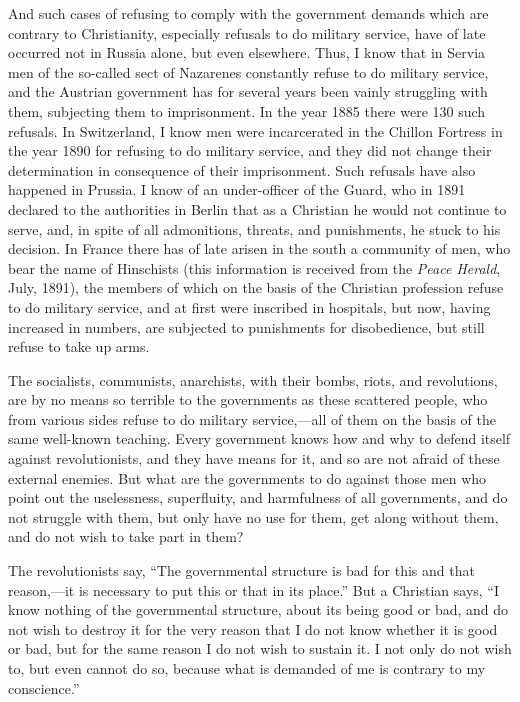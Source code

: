 \documentclass{book}
\begin{document}
And such cases of refusing to comply with the government demands which are contrary to Christianity, especially refusals to do military service, have of late occurred not in Russia alone, but even elsewhere. Thus, I know that in Servia men of the so-called sect of Nazarenes constantly refuse to do military service, and the Austrian government has for several years been vainly struggling with them, subjecting them to imprisonment. In the year 1885 there were 130 such refusals. In Switzerland, I know men were incarcerated in the Chillon Fortress in the year 1890 for refusing to do military service, and they did not change their determination in consequence of their imprisonment. Such refusals have also happened in Prussia. I know of an under-officer of the Guard, who in 1891 declared to the authorities in Berlin that as a Christian he would not continue to serve, and, in spite of all admonitions, threats, and punishments, he stuck to his decision. In France there has of late arisen in the south a community of men, who bear the name of Hinschists (this information is received from the \emph{Peace Herald}, July, 1891), the members of which on the basis of the Christian profession refuse to do military service, and at first were inscribed in hospitals, but now, having increased in numbers, are subjected to punishments for disobedience, but still refuse to take up arms.

The socialists, communists, anarchists, with their bombs, riots, and revolutions, are by no means so terrible to the governments as these scattered people, who from various sides refuse to do military service,—all of them on the basis of the same well-known teaching. Every government knows how and why to defend itself against revolutionists, and they have means for it, and so are not afraid of these external enemies. But what are the governments to do against those men who point out the uselessness, superfluity, and harmfulness of all governments, and do not struggle with them, but only have no use for them, get along without them, and do not wish to take part in them?

The revolutionists say, “The governmental structure is bad for this and that reason,—it is necessary to put this or that in its place.” But a Christian says, “I know nothing of the governmental structure, about its being good or bad, and do not wish to destroy it for the very reason that I do not know whether it is good or bad, but for the same reason I do not wish to sustain it. I not only do not wish to, but even cannot do so, because what is demanded of me is contrary to my conscience.”
\end{document}
